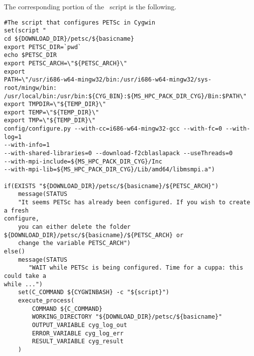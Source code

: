 \documentclass[10pt,a4paper]{article}
\begin{document}
\begin{center}
\end{center}

The corresponding portion of the \chastelibbuilder\ script is the following. 


\begin{codeparchment}
\begin{lstlisting}[]
#The script that configures PETSc in Cygwin
set(script "
cd ${DOWNLOAD_DIR}/petsc/${basicname} 
export PETSC_DIR=`pwd` 
echo $PETSC_DIR 
export PETSC_ARCH=\"${PETSC_ARCH}\" 
export
PATH=\"/usr/i686-w64-mingw32/bin:/usr/i686-w64-mingw32/sys-root/mingw/bin:
/usr/local/bin:/usr/bin:${CYG_BIN}:${MS_HPC_PACK_DIR_CYG}/Bin:$PATH\" 
export TMPDIR=\"${TEMP_DIR}\"
export TEMP=\"${TEMP_DIR}\"
export TMP=\"${TEMP_DIR}\"
config/configure.py --with-cc=i686-w64-mingw32-gcc --with-fc=0 --with-log=1
--with-info=1
--with-shared-libraries=0 --download-f2cblaslapack --useThreads=0 
--with-mpi-include=${MS_HPC_PACK_DIR_CYG}/Inc 
--with-mpi-lib=${MS_HPC_PACK_DIR_CYG}/Lib/amd64/libmsmpi.a")

if(EXISTS "${DOWNLOAD_DIR}/petsc/${basicname}/${PETSC_ARCH}")
	message(STATUS 
	"It seems PETSc has already been configured. If you wish to create a fresh
configure, 
	you can either delete the folder
${DOWNLOAD_DIR}/petsc/${basicname}/${PETSC_ARCH} or 
	change the variable PETSC_ARCH")
else()	
	message(STATUS 
	   "WAIT while PETSc is being configured. Time for a cuppa: this could take a
while ...")
	set(C_COMMAND ${CYGWINBASH} -c "${script}")
  	execute_process(
		COMMAND ${C_COMMAND}
		WORKING_DIRECTORY "${DOWNLOAD_DIR}/petsc/${basicname}"
		OUTPUT_VARIABLE cyg_log_out 
		ERROR_VARIABLE cyg_log_err 
		RESULT_VARIABLE cyg_result
	)
\end{lstlisting}
\end{codeparchment}
 
\end{document}
